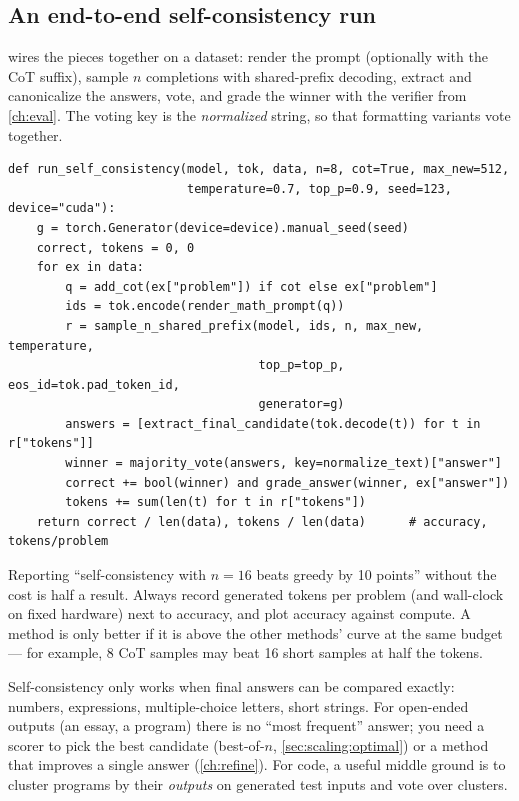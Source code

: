\subsection{An end-to-end self-consistency run}
 wires the pieces together on a dataset: render the prompt (optionally with
the CoT suffix), sample $n$ completions with shared-prefix decoding, extract and canonicalize the
answers, vote, and grade the winner with the verifier from \cref{ch:eval}. The voting key is the
\emph{normalized} string, so that formatting variants vote together.

\begin{lstlisting}[caption={Self-consistency over a dataset (condensed from \texttt{labs/lab18\_scaling/run.py}).},label={lst:scaling:scrun}]
def run_self_consistency(model, tok, data, n=8, cot=True, max_new=512,
                         temperature=0.7, top_p=0.9, seed=123, device="cuda"):
    g = torch.Generator(device=device).manual_seed(seed)
    correct, tokens = 0, 0
    for ex in data:
        q = add_cot(ex["problem"]) if cot else ex["problem"]
        ids = tok.encode(render_math_prompt(q))
        r = sample_n_shared_prefix(model, ids, n, max_new, temperature,
                                   top_p=top_p, eos_id=tok.pad_token_id,
                                   generator=g)
        answers = [extract_final_candidate(tok.decode(t)) for t in r["tokens"]]
        winner = majority_vote(answers, key=normalize_text)["answer"]
        correct += bool(winner) and grade_answer(winner, ex["answer"])
        tokens += sum(len(t) for t in r["tokens"])
    return correct / len(data), tokens / len(data)      # accuracy, tokens/problem
\end{lstlisting}

\begin{keyidea}
Reporting ``self-consistency with $n=16$ beats greedy by 10 points'' without the cost is half a
result. Always record generated tokens per problem (and wall-clock on fixed hardware) next to
accuracy, and plot accuracy against compute. A method is only better if it is above the other
methods' curve at the same budget --- for example, 8 CoT samples may beat 16 short samples at half
the tokens.
\end{keyidea}

\begin{pitfall}
Self-consistency only works when final answers can be compared exactly: numbers, expressions,
multiple-choice letters, short strings. For open-ended outputs (an essay, a program) there is no
``most frequent'' answer; you need a scorer to pick the best candidate (best-of-$n$,
\cref{sec:scaling:optimal}) or a method that improves a single answer (\cref{ch:refine}). For code,
a useful middle ground is to cluster programs by their \emph{outputs} on generated test inputs and
vote over clusters.
\end{pitfall}

